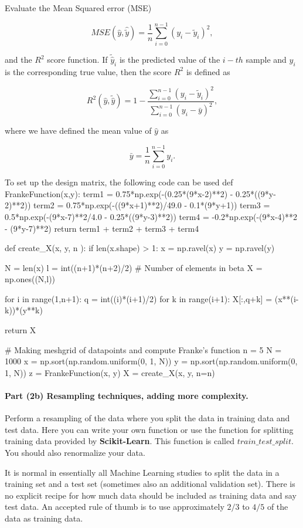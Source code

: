 \documentclass[%
oneside,                 %
final,                   %
10pt]{article}
\begin{document}
Evaluate the Mean Squared error (MSE)

\[ MSE(\hat{y},\hat{\tilde{y}}) = \frac{1}{n}
\sum_{i=0}^{n-1}(y_i-\tilde{y}_i)^2, 
\] 

and the $R^2$ score function.  If $\tilde{\hat{y}}_i$ is the predicted
value of the $i-th$ sample and $y_i$ is the corresponding true value,
then the score $R^2$ is defined as

\[
R^2(\hat{y}, \tilde{\hat{y}}) = 1 - \frac{\sum_{i=0}^{n - 1} (y_i - \tilde{y}_i)^2}{\sum_{i=0}^{n - 1} (y_i - \bar{y})^2},
\]

where we have defined the mean value  of $\hat{y}$ as

\[
\bar{y} =  \frac{1}{n} \sum_{i=0}^{n - 1} y_i.
\]


To set up the design matrix, the following code can be used
\bpycod
def FrankeFunction(x,y):
	term1 = 0.75*np.exp(-(0.25*(9*x-2)**2) - 0.25*((9*y-2)**2))
	term2 = 0.75*np.exp(-((9*x+1)**2)/49.0 - 0.1*(9*y+1))
	term3 = 0.5*np.exp(-(9*x-7)**2/4.0 - 0.25*((9*y-3)**2))
	term4 = -0.2*np.exp(-(9*x-4)**2 - (9*y-7)**2)
	return term1 + term2 + term3 + term4


def create_X(x, y, n ):
	if len(x.shape) > 1:
		x = np.ravel(x)
		y = np.ravel(y)

	N = len(x)
	l = int((n+1)*(n+2)/2)		# Number of elements in beta
	X = np.ones((N,l))

	for i in range(1,n+1):
		q = int((i)*(i+1)/2)
		for k in range(i+1):
			X[:,q+k] = (x**(i-k))*(y**k)

	return X


# Making meshgrid of datapoints and compute Franke's function
n = 5
N = 1000
x = np.sort(np.random.uniform(0, 1, N))
y = np.sort(np.random.uniform(0, 1, N))
z = FrankeFunction(x, y)
X = create_X(x, y, n=n)    
\epycod


\paragraph{Part (2b) Resampling techniques, adding more complexity.}
Perform a resampling of the data where you split the data in training
data and test data. Here you can write your own function or use the
function for splitting training data provided by \textbf{Scikit-Learn}.
This function is called $train\_test\_split$.   You should also renormalize your data.

It is normal in essentially all Machine Learning studies to split the
data in a training set and a test set (sometimes also an additional
validation set).  There
is no explicit recipe for how much data should be included as training
data and say test data.  An accepted rule of thumb is to use
approximately $2/3$ to $4/5$ of the data as training data.
\end{document}
